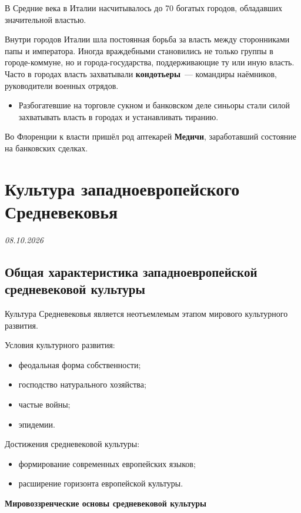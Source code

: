 \documentclass[a4paper, 12pt]{article}
\newcommand{\lecdate}[1]{\vspace{-4pt}\hfill{\small\textit{#1}}\par}
\begin{document}
В Средние века в Италии насчитывалось до 70 богатых городов, обладавших
значительной властью.

Внутри городов Италии шла постоянная борьба за власть между сторонниками
папы и императора. Иногда враждебными становились не только группы в
городе-коммуне, но и города-государства, поддерживающие ту или иную власть.
Часто в городах власть захватывали \textbf{кондотьеры}~--- командиры
наёмников, руководители военных отрядов.
\begin{itemize}[noitemsep]
  \item Разбогатевшие на торговле сукном и банковском деле синьоры стали
  силой захватывать власть в городах и устанавливать тиранию.
\end{itemize}

Во Флоренции к власти пришёл род аптекарей \textbf{Медичи}, заработавший
состояние на банковских сделках.

\section{Культура западноевропейского Средневековья}
\lecdate{08.10.2026}

\subsection{Общая характеристика западноевропейской средневековой культуры}
Культура Средневековья является неотъемлемым этапом мирового культурного
развития.

Условия культурного развития:
\begin{itemize}[noitemsep]
  \item феодальная форма собственности;
  \item господство натурального хозяйства;
  \item частые войны;
  \item эпидемии.
\end{itemize}

Достижения средневековой культуры:
\begin{itemize}[noitemsep]
  \item формирование современных европейских языков;
  \item расширение горизонта европейской культуры.
\end{itemize}

\begin{center}
\textbf{Мировоззренческие основы средневековой культуры}
\end{center}
\end{document}

